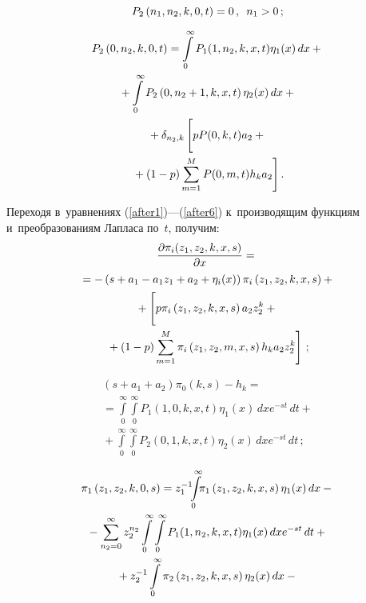 \begin{multicols}{2}
\vspace*{-3pt}

\noindent
\begin{equation}
P_2\left(n_1,n_2,k,0,t\right)=0\,,\enskip n_1>0\,;
\label{after5}
\end{equation}

\vspace*{-12pt}

\noindent
\begin{multline}
P_2\left(0,n_2,k,0,t\right)=\int\limits_0^{\infty}P_1(1,n_2,k,x,t)\eta_1(x)\,dx+{}\\
{}+\int\limits_0^{\infty}P_2\left(0,n_2+1,k,x,t\right)
\eta_2(x)\,dx+{}\\
{}+\delta_{n_2,k}\left[
\vphantom{\sum\limits_{m=1}^{M}}
pP(0,k,t)a_2+{}\right.\\
\left.{}+(1-p)
\sum\limits_{m=1}^{M}P(0,m,t)h_k a_2\right].\label{after6}
\end{multline}

Переходя в~уравнениях (\ref{after1})---(\ref{after6}) 
к~производящим функциям и~преобразованиям Лапласа по~$t$, получим:
\begin{multline*}
\fr{\partial \pi_i(z_1,z_2,k,x,s)}{\partial x}={}\\
{}=
-\left(s+a_1-a_1 z_1+a_2+\eta_i(x)\right)\pi_i\left(z_1,z_2,k,x,s\right)+{}\\
{}+\left[
\vphantom{\sum\limits_{m=1}^{M}}
p\pi_i\left(z_1,z_2,k,x,s\right)
a_2 z_2^k+{}\right.\\
\left.{}+(1-p)\sum\limits_{m=1}^{M}
\pi_i\left(z_1,z_2,m,x,s\right)h_k a_2 z_2^k\right]\,;
\end{multline*}

\vspace*{-12pt}

\noindent
\begin{multline}
\left(s+a_1+a_2\right)\pi_0(k,s)-h_k={}\\
{}=
\int\limits_0^{\infty}\int\limits_0^{\infty}P_1(1,0,k,x,t)\eta_1(x)\,dx e^{-st}\,dt+{}\\
{}+\int\limits_0^{\infty}\int\limits_0^{\infty}P_2(0,1,k,x,t)\eta_2(x)\,dx e^{-st}\,dt\,;
\label{second}
\end{multline}

\vspace*{-12pt}

\noindent
\begin{multline*}
\pi_1\left(z_1,z_2,k,0,s\right)=
z_1^{-1}\hspace*{-4pt}\int\limits_0^{\infty}
\hspace*{-4pt}\pi_1\left(z_1,z_2,k,x,s\right)\eta_1(x)\,dx-{}\hspace*{-0.78543pt}\\
{}-\sum\limits_{n_2=0}^{\infty}z_2^{n_2}
\int\limits_0^{\infty}\int\limits_0^{\infty}P_1(1,n_2,k,x,t)\eta_1(x)\,dx e^{-st}\,dt+{}\\
{}+
z_2^{-1}\int\limits_0^{\infty}\pi_2\left(z_1,z_2,k,x,s\right)\eta_2(x)\,dx-{}
\end{multline*}


\end{multicols}
